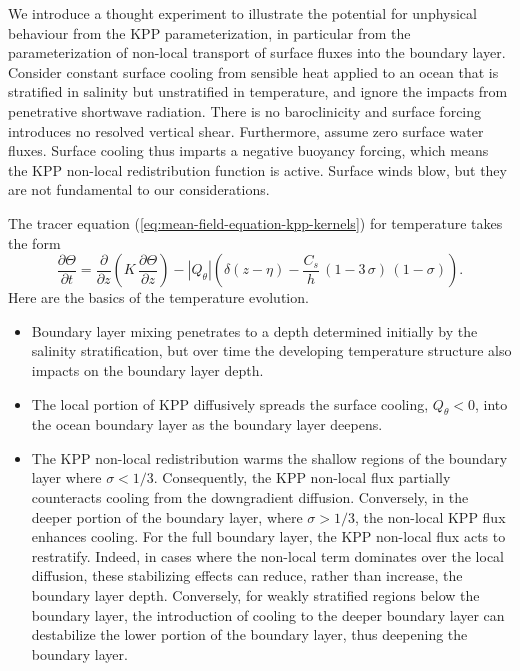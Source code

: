 We introduce a thought experiment to illustrate the potential for
unphysical behaviour from the KPP parameterization, in particular from
the parameterization of non-local transport of surface fluxes into the
boundary layer.  Consider constant surface cooling from sensible heat
applied to an ocean that is stratified in salinity but unstratified in
temperature, and ignore the impacts from penetrative shortwave
radiation.  There is no baroclinicity and surface forcing introduces
no resolved vertical shear.  Furthermore, assume zero surface water
fluxes.  Surface cooling thus imparts a negative buoyancy forcing,
which means the KPP non-local redistribution function is
active. Surface winds blow, but they are not fundamental to our
considerations.

The tracer equation (\ref{eq:mean-field-equation-kpp-kernels}) for
temperature takes the form
\begin{equation}
 \frac{\partial \Theta}{\partial t} = 
   \frac{\partial}{\partial z} \left( K \, \frac{\partial \Theta}{\partial z} \right)
 - |Q_{\theta}| \left( \delta(z-\eta) - \frac{C_{s}}{h} \, (1-3 \, \sigma) \, (1-\sigma) \right).
\end{equation}
Here are the basics of the temperature evolution.
\begin{itemize}

\item Boundary layer mixing penetrates to a depth determined initially
  by the salinity stratification, but over time the developing
  temperature structure also impacts on the boundary layer depth. 

\item The local portion of KPP diffusively spreads the surface
  cooling, $Q_{\theta} < 0$, into the ocean boundary layer as the
  boundary layer deepens.

\item The KPP non-local redistribution warms the shallow regions of
  the boundary layer where $\sigma < 1/3$.  Consequently, the KPP
  non-local flux partially counteracts cooling from the downgradient
  diffusion.  Conversely, in the deeper portion of the boundary layer,
  where $\sigma > 1/3$, the non-local KPP flux enhances cooling.  For
  the full boundary layer, the KPP non-local flux acts to restratify.
  Indeed, in cases where the non-local term dominates over the local
  diffusion, these stabilizing effects can reduce, rather than
  increase, the boundary layer depth.  Conversely, for weakly
  stratified regions below the boundary layer, the introduction of
  cooling to the deeper boundary layer can destabilize the lower
  portion of the boundary layer, thus deepening the boundary layer.

\end{itemize}

